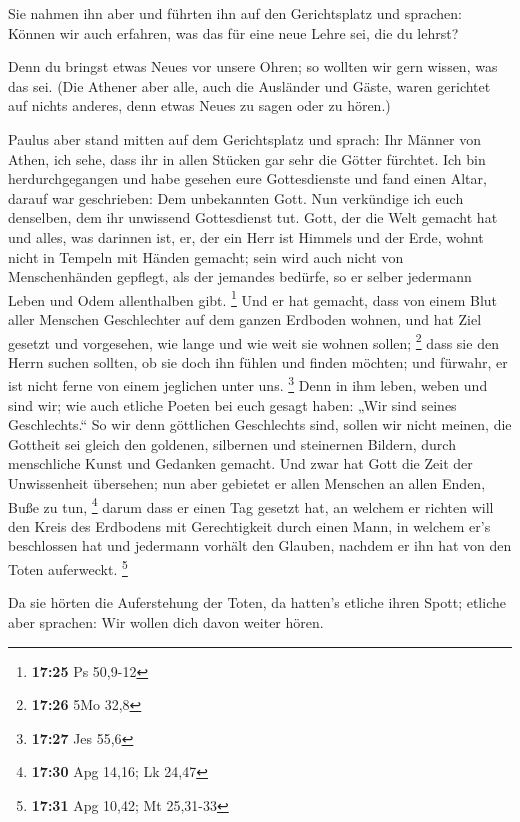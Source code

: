 Sie nahmen ihn aber und führten ihn auf den
Gerichtsplatz und sprachen: Können wir auch erfahren, was das für eine
neue Lehre sei, die du lehrst?

 Denn du bringst etwas Neues vor unsere Ohren; so wollten
wir gern wissen, was das sei.  (Die Athener aber alle,
auch die Ausländer und Gäste, waren gerichtet auf nichts anderes, denn
etwas Neues zu sagen oder zu hören.)

 Paulus aber stand mitten auf dem Gerichtsplatz und
sprach: Ihr Männer von Athen, ich sehe, dass ihr in allen Stücken gar
sehr die Götter fürchtet.  Ich bin herdurchgegangen und
habe gesehen eure Gottesdienste und fand einen Altar, darauf war
geschrieben: Dem unbekannten Gott. Nun verkündige ich euch denselben,
dem ihr unwissend Gottesdienst tut.  Gott, der die Welt
gemacht hat und alles, was darinnen ist, er, der ein Herr ist Himmels
und der Erde, wohnt nicht in Tempeln mit Händen gemacht; 
sein wird auch nicht von Menschenhänden gepflegt, als der jemandes
bedürfe, so er selber jedermann Leben und Odem allenthalben gibt.
\footnote{\textbf{17:25} Ps 50,9-12}  Und er hat gemacht,
dass von einem Blut aller Menschen Geschlechter auf dem ganzen Erdboden
wohnen, und hat Ziel gesetzt und vorgesehen, wie lange und wie weit sie
wohnen sollen; \footnote{\textbf{17:26} 5Mo 32,8}  dass
sie den Herrn suchen sollten, ob sie doch ihn fühlen und finden möchten;
und fürwahr, er ist nicht ferne von einem jeglichen unter uns.
\footnote{\textbf{17:27} Jes 55,6}  Denn in ihm leben,
weben und sind wir; wie auch etliche Poeten bei euch gesagt haben: „Wir
sind seines Geschlechts.``  So wir denn göttlichen
Geschlechts sind, sollen wir nicht meinen, die Gottheit sei gleich den
goldenen, silbernen und steinernen Bildern, durch menschliche Kunst und
Gedanken gemacht.  Und zwar hat Gott die Zeit der
Unwissenheit übersehen; nun aber gebietet er allen Menschen an allen
Enden, Buße zu tun, \footnote{\textbf{17:30} Apg 14,16; Lk 24,47}
 darum dass er einen Tag gesetzt hat, an welchem er
richten will den Kreis des Erdbodens mit Gerechtigkeit durch einen Mann,
in welchem er's beschlossen hat und jedermann vorhält den Glauben,
nachdem er ihn hat von den Toten auferweckt. \footnote{\textbf{17:31}
  Apg 10,42; Mt 25,31-33}

 Da sie hörten die Auferstehung der Toten, da hatten's
etliche ihren Spott; etliche aber sprachen: Wir wollen dich davon weiter
hören.

